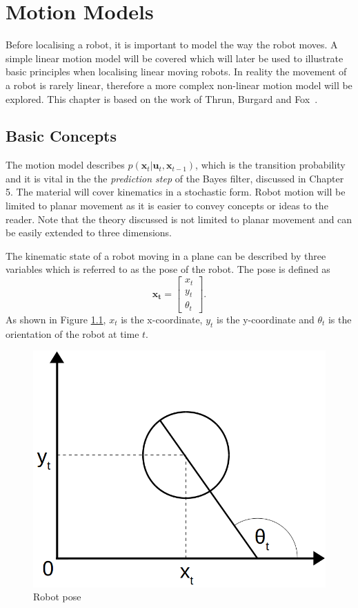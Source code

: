 \documentclass[12pt,oneside,openany,a4paper, %
afrikaans,english,
]{memoir}
\numberwithin{equation}{chapter}
\begin{document}
\chapter{Motion Models}\label{chapMotionModel}
Before localising a robot, it is important to model the way the robot moves. A simple linear motion model will be covered which will later be used to illustrate basic principles when localising linear moving robots. In reality the movement of a robot is rarely linear, therefore a more complex non-linear motion model will be explored. This chapter is based on the work of Thrun, Burgard and Fox~\citep{thrun}.
\section{Basic Concepts}
The motion model describes $p(\bm{x}_t|\bm{u}_t,\bm{x}_{t-1})$, which is the transition probability and it is vital in the the \textit{prediction step} of the Bayes filter, discussed in Chapter 5. The material will cover kinematics in a stochastic form. Robot motion will be limited to planar movement as it is easier to convey concepts or ideas to the reader. Note that the theory discussed is not limited to planar movement and can be easily extended to three dimensions.

The kinematic state of a robot moving in a plane can be described by three variables which is referred to as the pose of the robot.
The pose is defined as
\begin{equation}
\bm{x_t} =
\begin{bmatrix}
x_t\\
y_t\\
\theta_t
\end{bmatrix}.
\end{equation}
As shown in Figure \ref{fig:pose_robot}, $x_t$ is the x-coordinate, $y_t$ is the y-coordinate and $\theta_t$ is the orientation of the robot at time $t$.

\begin{figure}[H]
  \includegraphics[width=0.4\linewidth]{Figures/pose_robot.png}
  \centering
  \caption{Robot pose}
  \label{fig:pose_robot}
\end{figure}
\end{document}
